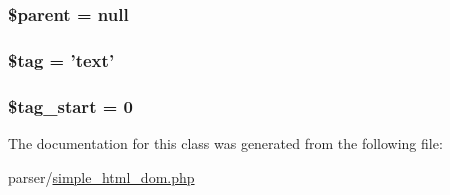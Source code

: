 \hypertarget{classsimple__html__dom__node_a4e2313a4b35b72a06ac45fd38960f677}{
\subsubsection[{\$parent}]{\setlength{\rightskip}{0pt plus 5cm}\${\bf parent} = null}}\label{classsimple__html__dom__node_a4e2313a4b35b72a06ac45fd38960f677}
\hypertarget{classsimple__html__dom__node_a81d5015d41ed8ec66e9db8cdc5db9555}{
\subsubsection[{\$tag}]{\setlength{\rightskip}{0pt plus 5cm}\${\bf tag} = '{\bf text}'}}\label{classsimple__html__dom__node_a81d5015d41ed8ec66e9db8cdc5db9555}
\hypertarget{classsimple__html__dom__node_af1af90d3ddaae5df362bdbfa7a5eb7e4}{
\subsubsection[{\$tag\+\_\+start}]{\setlength{\rightskip}{0pt plus 5cm}\$tag\+\_\+start = 0}}\label{classsimple__html__dom__node_af1af90d3ddaae5df362bdbfa7a5eb7e4}


The documentation for this class was generated from the following file\+:\begin{DoxyCompactItemize}
\item 
parser/\hyperlink{simple__html__dom_8php}{simple\+\_\+html\+\_\+dom.\+php}\end{DoxyCompactItemize}
